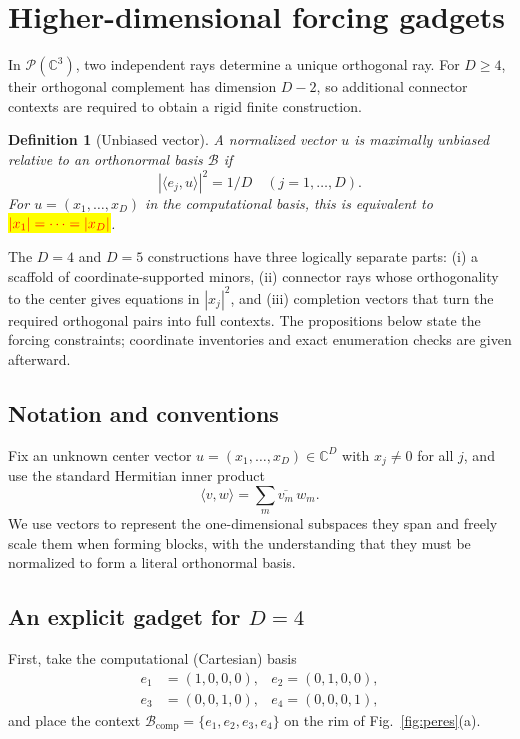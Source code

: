 \documentclass[%
  reprint,
  superscriptaddress,
  showpacs,
  showkeys,
  amsmath,amssymb,
  pra,
  longbibliography,
  floatfix,
  x11names
]{revtex4-2}
\newcommand{\rev}[1]{{#1}}
\newenvironment{revision}{\begingroup}{\endgroup}
\newcommand{\corrmath}[1]{\begingroup\setlength{\fboxsep}{1pt}\colorbox{yellow}{\ensuremath{\color{red}#1}}\endgroup}
\newtheorem{definition}{Definition}
\begin{document}




\section{Higher-dimensional forcing gadgets}
\label{2025-hdfg}

\begin{revision}
In $\mathcal{P}(\mathbb{C}^3)$, two independent rays determine a unique orthogonal ray.  For $D\geq4$, their orthogonal complement has dimension $D-2$, so additional connector contexts are required to obtain a rigid finite construction.

\begin{definition}[Unbiased vector]
\label{def:unbiased}
A normalized vector $u$ is maximally unbiased relative to an orthonormal basis $\mathcal{B}$ if
\[
|\langle e_j,u\rangle|^2=1/D\quad (j=1,\ldots,D).
\]
For $u=(x_1,\ldots,x_D)$ in the computational basis, this is equivalent to \corrmath{|x_1|=\cdots=|x_D|}.
\end{definition}

The $D=4$ and $D=5$ constructions have three logically separate parts: (i) a scaffold of coordinate-supported minors, (ii) connector rays whose orthogonality to the center gives equations in $|x_j|^2$, and (iii) completion vectors that turn the required orthogonal pairs into full contexts.  The propositions below state the forcing constraints; coordinate inventories and exact enumeration checks are given afterward.
\end{revision}

\subsection{Notation and conventions}
Fix an unknown center vector $u = (x_1,\dots,x_D) \in \mathbb{C}^D$ with $x_j \ne 0$ for all $j$, and use the standard Hermitian inner product
\[
\langle v,w\rangle = \sum_m \overline{v_m}\, w_m.
\]
We use vectors to represent the one-dimensional subspaces they span and freely scale them when forming blocks,
with the understanding that they must be normalized to form a literal orthonormal basis.

\subsection{An explicit gadget for $D=4$}

\rev{First, take the computational (Cartesian) basis}
\begin{align*}
e_1&=(1,0,0,0), &
e_2 =(0,1,0,0),\\
e_3&=(0,0,1,0), &
e_4 =(0,0,0,1),
\end{align*}
\rev{and place the context $\mathcal{B}_{\mathrm{comp}}=\{e_1,e_2,e_3,e_4\}$ on the rim of Fig.~\ref{fig:peres}(a).}
\end{document}
